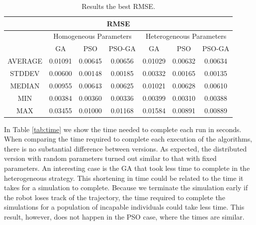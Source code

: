 \documentclass[runningheads]{llncs}
\begin{document}
\begin{table}[ht]
    \caption{Results the best RMSE.} 
    \label{tab:rmse}
    \centering
    \setlength{\tabcolsep}{3pt}
    \begin{tabular}{|c|c|c|c|c|c|c|}
      \hline
      \multicolumn{7}{|c|}{RMSE} \\ \hline
      & \multicolumn{3}{|c|}{Homogeneous Parameters}  & \multicolumn{3}{c|}{ Heterogeneous Parameters} \\
         \cline{2-7}

             & GA         & PSO        & PSO-GA       & GA        & PSO        & PSO-GA  \\ \hline
    AVERAGE   & 0.01091   & 0.00645    & 0.00656      & 0.01029    & 0.00632     & 0.00634\\ \hline
    STDDEV    & 0.00600   & 0.00148	   & 0.00185      & 0.00332    & 0.00165     & 0.00135\\ \hline   
    MEDIAN    & 0.00955	 	& 0.00643	   & 0.00625      & 0.01021    & 0.00628     & 0.00610\\ \hline 
    MIN       & 0.00384	  & 0.00360	   & 0.00336      & 0.00399    & 0.00310     & 0.00388\\ \hline   
    MAX       & 0.03455	  & 0.01000    & 0.01168      & 0.01584    & 0.00891     & 0.00889\\ \hline    
      \end{tabular}
\end{table}

In Table \ref{tab:time} we show the time needed to complete each run in
seconds. When comparing the time required to complete each execution of the
algorithms, there is no substantial difference between versions. As expected,
the distributed version with random parameters turned out similar to that with
fixed parameters. An interesting case is the GA that took less time to complete
in the heterogeneous strategy. This shortening in time could be related to the
time it takes for a simulation to complete. Because we terminate the simulation
early if the robot loses track of the trajectory, the time required to complete
the simulations for a population of incapable individuals could take less time.
This result, however, does not happen in the PSO case, where the times are
similar. 
\end{document}
